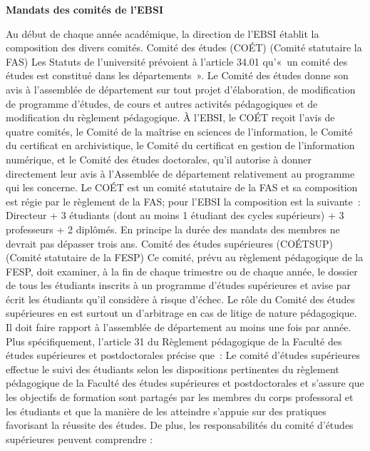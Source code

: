 \documentclass [12 pt]{article}
\begin{document}
        \textbf{
        Mandats des comités de l'EBSI
        }
    
            Au début de chaque année académique, la direction de l'EBSI établit la composition
                des divers comités.
            Comité des études (COÉT) (Comité statutaire la FAS)
            Les Statuts de l'université prévoient à l'article 34.01 qu'« un comité des
                études est constitué dans les départements ». Le Comité des études donne son
                avis à l'assemblée de département sur tout projet d'élaboration, de modification de
                programme d'études, de cours et autres activités pédagogiques et de modification du
                règlement pédagogique. À l'EBSI, le COÉT reçoit l'avis de quatre comités, le Comité
                de la maîtrise en sciences de l'information, le Comité du certificat en
                archivistique, le Comité du certificat en gestion de l'information numérique, et le
                Comité des études doctorales, qu'il autorise à donner directement leur avis à
                l'Assemblée de département relativement au programme qui les concerne. Le COÉT est
                un comité statutaire de la FAS et sa composition est régie par le règlement de la
                FAS; pour l'EBSI la composition est la suivante : Directeur + 3 étudiants (dont
                au moins 1 étudiant des cycles supérieurs) + 3 professeurs + 2 diplômés. En principe
                la durée des mandats des membres ne devrait pas dépasser trois ans.
            Comité des études supérieures (COÉTSUP) (Comité statutaire de la
                FESP)
            Ce comité, prévu au règlement pédagogique de la FESP, doit examiner, à la fin de
                chaque trimestre ou de chaque année, le dossier de tous les étudiants inscrits à un
                programme d'études supérieures et avise par écrit les étudiants qu'il considère à
                risque d'échec. Le rôle du Comité des études supérieures en est surtout un
                d'arbitrage en cas de litige de nature pédagogique. Il doit faire rapport à
                l'assemblée de département au moins une fois par année. Plus spécifiquement,
                l'article 31 du Règlement pédagogique de la Faculté des études supérieures et
                postdoctorales précise que :
            Le comité d'études supérieures effectue le suivi des
                étudiants selon les dispositions pertinentes du règlement pédagogique de la Faculté
                des études supérieures et postdoctorales et s'assure que les objectifs de formation
                sont partagés par les membres du corps professoral et les étudiants et que la
                manière de les atteindre s'appuie sur des pratiques favorisant la réussite des
                études.
            De plus, les responsabilités du comité d'études supérieures peuvent comprendre :
            
\end{document}
